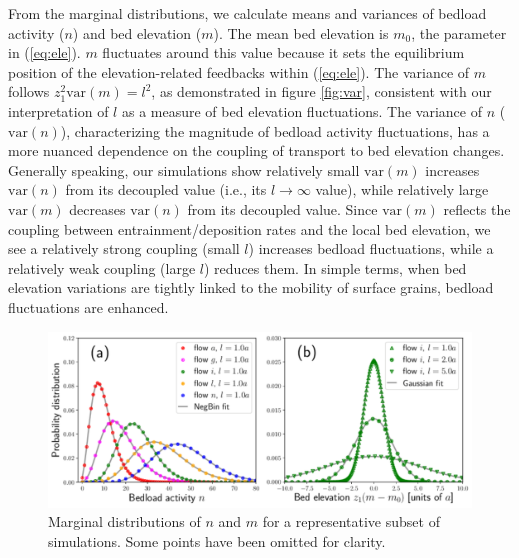 \documentclass[draft]{agujournal2018}
\begin{document}
From the marginal distributions, we calculate means and variances of bedload activity ($n$) and bed elevation ($m$).
The mean bed elevation is $m_0$, the parameter in (\ref{eq:ele}). $m$ fluctuates around this value because it sets the equilibrium position of the elevation-related feedbacks within (\ref{eq:ele}).
The variance of $m$ follows $z_1^2 \text{var}(m) = l^2$, as demonstrated in figure \ref{fig:var}, consistent with our interpretation of $l$ as a measure of bed elevation fluctuations.
The variance of $n$ ($\text{var}(n)$), characterizing the magnitude of bedload activity fluctuations, has a more nuanced dependence on the coupling of transport to bed elevation changes.
Generally speaking, our simulations show relatively small $\text{var}(m)$ increases $\text{var}(n)$ from its decoupled value (i.e., its $l\rightarrow \infty$ value), while relatively large $\text{var}(m)$ decreases $\text{var}(n)$ from its decoupled value.
Since $\text{var}(m)$ reflects the coupling between entrainment/deposition rates and the local bed elevation, we see a relatively strong coupling (small $l$) increases bedload fluctuations, while a relatively weak coupling (large $l$) reduces them.
In simple terms, when bed elevation variations are tightly linked to the mobility of surface grains, bedload fluctuations are enhanced.

\begin{figure}
	\includegraphics[width=\linewidth,keepaspectratio]{../figures/montage2.pdf}
	\caption{Marginal distributions of $n$ and $m$ for a representative subset of simulations. Some points have been omitted for clarity.}
	\label{fig:pdfs}
\end{figure}
\end{document}
